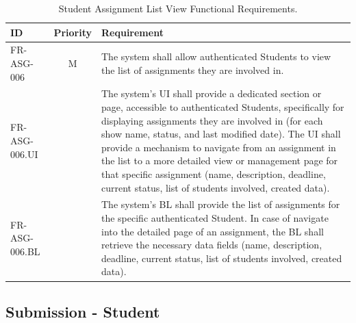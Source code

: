 \begin{table}[h]
    \centering
    \begin{tabular}{|l|c|p{10cm}|}
        \hline
        \textbf{ID} & \textbf{Priority} & \textbf{Requirement} \\
        \hline
        FR-ASG-006 & M & The system shall allow authenticated Students to view the list of assignments they are involved in. \\
        \quad FR-ASG-006.UI &  & \quad The system's UI shall provide a dedicated section or page, accessible to authenticated Students, specifically for displaying assignments they are involved in (for each show name, status, and last modified date). The UI shall provide a mechanism to navigate from an assignment in the list to a more detailed view or management page for that specific assignment (name, description, deadline, current status, list of students involved, created data). \\
        \quad FR-ASG-006.BL &  & \quad The system’s BL shall provide the list of assignments for the specific authenticated Student. In case of navigate into the detailed page of an assignment, the BL shall retrieve the necessary data fields (name, description, deadline, current status, list of students involved, created data). \\
        \hline
    \end{tabular}
    \caption{Student Assignment List View Functional Requirements.}
    \label{tab:StudentAssignmentViewFR}
\end{table}
\vspace*{\fill}

\clearpage
\vspace*{\fill}
\subsection{Submission - Student}

